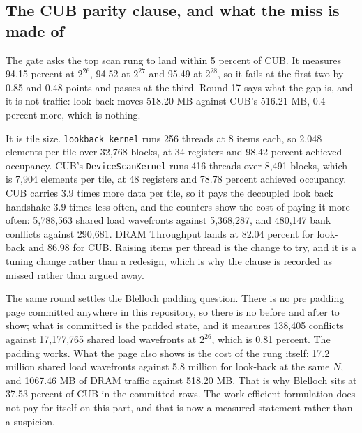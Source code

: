 \subsection{The CUB parity clause, and what the miss is made of}
\label{sec:scangate}

The gate asks the top scan rung to land within 5 percent of CUB. It measures 94.15
percent at $2^{26}$, 94.52 at $2^{27}$ and 95.49 at $2^{28}$, so it fails at the
first two by 0.85 and 0.48 points and passes at the third. Round 17 says what the
gap is, and it is not traffic: look-back moves 518.20 MB against CUB's 516.21 MB,
0.4 percent more, which is nothing.

It is tile size. \texttt{lookback\_kernel} runs 256 threads at 8 items each, so
2,048 elements per tile over 32,768 blocks, at 34 registers and 98.42 percent
achieved occupancy. CUB's \texttt{DeviceScanKernel} runs 416 threads over 8,491
blocks, which is 7,904 elements per tile, at 48 registers and 78.78 percent
achieved occupancy. CUB carries 3.9 times more data per tile, so it pays the
decoupled look back handshake 3.9 times less often, and the counters show the cost
of paying it more often: 5,788,563 shared load wavefronts against 5,368,287, and
480,147 bank conflicts against 290,681. DRAM Throughput lands at 82.04 percent for
look-back and 86.98 for CUB. Raising items per thread is the change to try, and it
is a tuning change rather than a redesign, which is why the clause is recorded as
missed rather than argued away.

The same round settles the Blelloch padding question. There is no pre padding page
committed anywhere in this repository, so there is no before and after to show;
what is committed is the padded state, and it measures 138,405 conflicts against
17,177,765 shared load wavefronts at $2^{26}$, which is 0.81 percent. The padding
works. What the page also shows is the cost of the rung itself: 17.2 million shared
load wavefronts against 5.8 million for look-back at the same $N$, and 1067.46 MB
of DRAM traffic against 518.20 MB. That is why Blelloch sits at 37.53 percent of
CUB in the committed rows. The work efficient formulation does not pay for itself
on this part, and that is now a measured statement rather than a suspicion.
